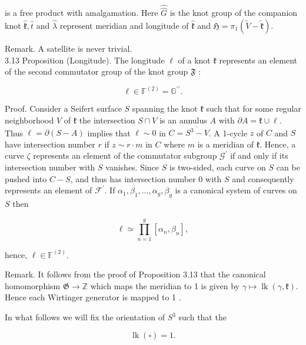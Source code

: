 \documentclass[10pt, letterpaper]{article}
\begin{document}
is a free product with amalgamation. Here $\widehat{\widehat{G}}$ is the knot group of the companion knot $\widehat{\mathfrak{k}}, \widehat{t}$ and $\widehat{\lambda}$ represent meridian and longitude of $\widehat{\mathfrak{k}}$ and $\mathfrak{H}=\pi_{1}(\widetilde{V}-\widetilde{\mathfrak{k}})$.

Remark. A satellite is never trivial.\\
3.13 Proposition (Longitude). The longitude $\ell$ of a knot $\mathfrak{k}$ represents an element of the second commutator group of the knot group $\mathfrak{F}$ :

$$
\ell \in \mathbb{F}^{(2)}=\mathbb{G}^{\prime \prime} .
$$

Proof. Consider a Seifert surface $S$ spanning the knot $\mathfrak{k}$ such that for some regular neighborhood $V$ of $\mathfrak{k}$ the intersection $S \cap V$ is an annulus $A$ with $\partial A=\mathfrak{k} \cup \ell$. Thus $\ell=\partial(S-A)$ implies that $\ell \sim 0$ in $C=\overline{S^{3}-V}$. A 1-cycle $z$ of $C$ and $S$ have intersection number $r$ if $z \sim r \cdot m$ in $C$ where $m$ is a meridian of $\mathfrak{k}$. Hence, a curve $\zeta$ represents an element of the commutator subgroup $\mathcal{G}^{\prime}$ if and only if its intersection number with $S$ vanishes. Since $S$ is two-sided, each curve on $S$ can be pushed into $C-S$, and thus has intersection number 0 with $S$ and consequently represents an element of $\mathscr{F}^{\prime}$. If $\alpha_{1}, \beta_{1}, \ldots, \alpha_{g}, \beta_{g}$ is a canonical system of curves on $S$ then

$$
\ell \simeq \prod_{n=1}^{g}\left[\alpha_{n}, \beta_{n}\right],
$$

hence, $\ell \in \mathbb{F}^{(2)}$.

Remark. It follows from the proof of Proposition 3.13 that the canonical homomorphism $\mathfrak{G} \rightarrow \mathbb{Z}$ which maps the meridian to 1 is given by $\gamma \mapsto \operatorname{lk}(\gamma, \mathfrak{k})$. Hence each Wirtinger generator is mapped to 1 .

In what follows we will fix the orientation of $S^{3}$ such that the

$$
\operatorname{lk}(\square)=1 .
$$
\end{document}
